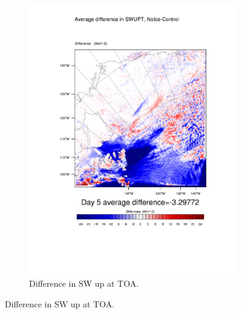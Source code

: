 \begin{figure}
\begin{subfigure}{0.48\textwidth}
		\includegraphics[width=\textwidth]{results/noice/diff_NoIce_SWUPT_Day5.pdf}
		\caption{Difference in SW up at TOA.}
		\label{subfig:swup_r2Day5}
	\end{subfigure}
	

\end{figure}
